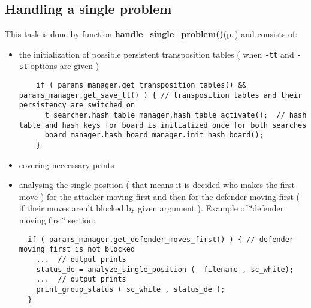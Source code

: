 \subsection{Handling a single problem}\label{page_2_page_2__sec_2}
This task is done by function {\bf handle\_\-single\_\-problem()}{\rm (p.\,\pageref{main_8cc_a3})} and consists of:\begin{itemize}
\item the initialization of possible persistent transposition tables ( when {\tt -tt} and {\tt -st} options are given ) 

\footnotesize\begin{verbatim}    if ( params_manager.get_transposition_tables() && params_manager.get_save_tt() ) { // transposition tables and their persistency are switched on 
      t_searcher.hash_table_manager.hash_table_activate();  // hash table and hash keys for board is initialized once for both searches
      board_manager.hash_board_manager.init_hash_board();   
    }
\end{verbatim}
\normalsize
\item covering neccessary prints\item analysing the single position ( that means it is decided who makes the first move ) for the attacker moving first and then for the defender moving first ( if their moves aren't blocked by given argument ). Example of \char`\"{}defender moving first\char`\"{} section: 

\footnotesize\begin{verbatim}  if ( params_manager.get_defender_moves_first() ) { // defender moving first is not blocked 
    ...  // output prints
    status_de = analyze_single_position (  filename , sc_white);
    ...  // output prints
    print_group_status ( sc_white , status_de );
  }
\end{verbatim}
\normalsize
\end{itemize}
